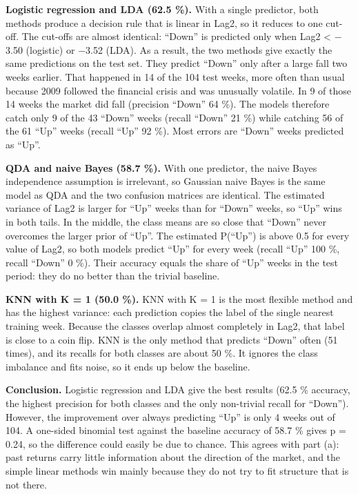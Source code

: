 \documentclass[11pt]{article}
\begin{document}
\textbf{Logistic regression and LDA (62.5 \%).} With a single predictor, both methods produce a decision rule that is linear in Lag2, so it reduces to one cut-off. The cut-offs are almost identical: ``Down'' is predicted only when Lag2 \textless{} $-$3.50 (logistic) or $-$3.52 (LDA). As a result, the two methods give exactly the same predictions on the test set. They predict ``Down'' only after a large fall two weeks earlier. That happened in 14 of the 104 test weeks, more often than usual because 2009 followed the financial crisis and was unusually volatile. In 9 of those 14 weeks the market did fall (precision ``Down'' 64 \%). The models therefore catch only 9 of the 43 ``Down'' weeks (recall ``Down'' 21 \%) while catching 56 of the 61 ``Up'' weeks (recall ``Up'' 92 \%). Most errors are ``Down'' weeks predicted as ``Up''.

\textbf{QDA and naive Bayes (58.7 \%).} With one predictor, the naive Bayes independence assumption is irrelevant, so Gaussian naive Bayes is the same model as QDA and the two confusion matrices are identical. The estimated variance of Lag2 is larger for ``Up'' weeks than for ``Down'' weeks, so ``Up'' wins in both tails. In the middle, the class means are so close that ``Down'' never overcomes the larger prior of ``Up''. The estimated P(``Up'') is above 0.5 for every value of Lag2, so both models predict ``Up'' for every week (recall ``Up'' 100 \%, recall ``Down'' 0 \%). Their accuracy equals the share of ``Up'' weeks in the test period: they do no better than the trivial baseline.

\textbf{KNN with K = 1 (50.0 \%).} KNN with K = 1 is the most flexible method and has the highest variance: each prediction copies the label of the single nearest training week. Because the classes overlap almost completely in Lag2, that label is close to a coin flip. KNN is the only method that predicts ``Down'' often (51 times), and its recalls for both classes are about 50 \%. It ignores the class imbalance and fits noise, so it ends up below the baseline.

\textbf{Conclusion.} Logistic regression and LDA give the best results (62.5 \% accuracy, the highest precision for both classes and the only non-trivial recall for ``Down''). However, the improvement over always predicting ``Up'' is only 4 weeks out of 104. A one-sided binomial test against the baseline accuracy of 58.7 \% gives p = 0.24, so the difference could easily be due to chance. This agrees with part (a): past returns carry little information about the direction of the market, and the simple linear methods win mainly because they do not try to fit structure that is not there.
\end{document}

